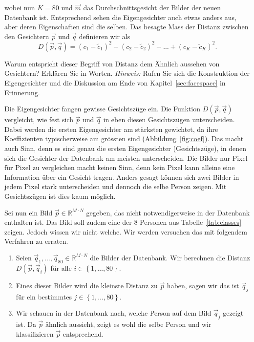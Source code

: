 wobei nun $K=80$ und $\vec m$ das Durchschnittsgesicht der Bilder der neuen Datenbank ist.
Entsprechend sehen die Eigengesichter auch etwas anders aus, aber deren Eigenschaften sind die selben.
Das besagte Mass der Distanz zwischen den Gesichtern $\vec p$ und $\vec q$ definieren wir als
\begin{equation*}
	D\left(\vec p,\vec q\right)=\left(c_1-\tilde c_1\right)^2+\left(c_2-\tilde c_2\right)^2+\ldots+\left(c_K-\tilde c_K\right)^2.
\end{equation*}
\begin{aufgabe} \label{aufg:quantification}
	Warum entspricht dieser Begriff von Distanz dem \glqq{}Ähnlich aussehen\grqq{} von Gesichtern?
	Erklären Sie in Worten.
	\textit{Hinweis:} Rufen Sie sich die Konstruktion der Eigengesichter und die Diskussion am Ende von Kapitel~\ref{sec:facespace} in Erinnerung.
\end{aufgabe}
\begin{losung}
	Die Eigengesichter fangen gewisse Gesichtszüge ein.
	Die Funktion $D\left(\vec p,\vec q\right)$ vergleicht, wie fest sich $\vec p$ und $\vec q$ in eben diesen Gesichtszügen unterscheiden.
	Dabei werden die ersten Eigengesichter am stärksten gewichtet, da ihre Koeffizienten typischerweise am grössten sind (Abbildung~\ref{fig:coef}).
	Das macht auch Sinn, denn es sind genau die ersten Eigengesichter (Gesichtszüge), in denen sich die Gesichter der Datenbank am meisten unterscheiden.
	Die Bilder nur Pixel für Pixel zu vergleichen macht keinen Sinn, denn kein Pixel kann alleine eine Information über ein Gesicht tragen.
	Anders gesagt können sich zwei Bilder in jedem Pixel stark unterscheiden und dennoch die selbe Person zeigen.
	Mit Gesichtszügen ist dies kaum möglich.
\end{losung}
Sei nun ein Bild $\vec p\in\mathbb R^{M\cdot N}$ gegeben, das nicht notwendigerweise in der Datenbank enthalten ist.
Das Bild soll zudem eine der 8 Personen aus Tabelle~\ref{tab:classes} zeigen.
Jedoch wissen wir nicht welche.
Wir werden versuchen das mit folgendem Verfahren zu erraten.
\begin{enumerate}[leftmargin=3cm, label=Schritt \arabic*:]
	\item Seien $\vec q_1,\ldots,\vec q_{80}\in\mathbb R^{M\cdot N}$ die Bilder der Datenbank.
	Wir berechnen die Distanz $D\left(\vec p,\vec q_i\right)$ für alle $i\in\left\{1,\ldots,80\right\}$.
	\item Eines dieser Bilder wird die kleinste Distanz zu $\vec p$ haben, sagen wir das ist $\vec q_j$ für ein bestimmtes $j\in\left\{1,\ldots,80\right\}$.
	\item Wir schauen in der Datenbank nach, welche Person auf dem Bild $\vec q_j$ gezeigt ist. Da $\vec p$ ähnlich aussieht, zeigt es wohl die selbe Person und wir klassifizieren $\vec p$ entsprechend.
\end{enumerate}
